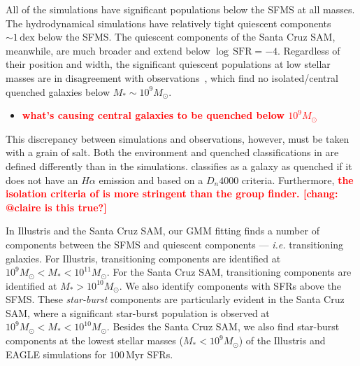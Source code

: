 \documentclass[preprint2,tighten]{aastex62}
\newcommand{\todo}[1]{{\bf \textcolor{red}{ #1}}}
\begin{document}
All of the simulations have significant populations below the SFMS at all 
masses. The hydrodynamical simulations have relatively tight quiescent components 
$\sim 1\,\mathrm{dex}$ below the SFMS. The quiescent components of the 
Santa Cruz SAM, meanwhile, are much broader and extend below 
$\log\,\mathrm{SFR} = -4$. Regardless of their position and width, the 
significant quiescent populations at low stellar masses are in disagreement
with observations~\citep{geha2012}, which find no isolated/central quenched 
galaxies below $M_* \sim 10^9 M_\odot$. 
\begin{itemize}
    \item \todo{what's causing central galaxies to be quenched below 
        $10^9M_\odot$}
\end{itemize}
This discrepancy between simulations and observations, however, must be 
taken with a grain of salt. Both the environment and quenched classifications 
in \cite{geha2012} are defined differently than in the simulations. 
\cite{geha2012} classifies as a galaxy as quenched if it
does not have an $H\alpha$ emission and based on a $D_n 4000$ criteria. 
Furthermore, \todo{the isolation criteria of \cite{geha2012} is more 
stringent than the group finder. [chang: @claire is this true?]} 

In Illustris and the Santa Cruz SAM, our GMM fitting
finds a number of components between the SFMS and quiescent components ---
\emph{i.e.} transitioning galaxies. For Illustris, transitioning components 
are identified at $10^9 M_\odot < M_* < 10^{11}M_\odot$. For the Santa Cruz SAM, 
transitioning components are identified at $M_* > 10^{10} M_\odot$. We also 
identify components with SFRs above the SFMS. These \emph{star-burst} 
components are particularly evident in the Santa Cruz SAM, where a significant
star-burst population is observed at $10^9 M_\odot < M_* < 10^{10} M_\odot$. 
Besides the Santa Cruz SAM, we also find star-burst components at the lowest
stellar masses ($M_* < 10^9 M_\odot$) of the Illustris and EAGLE simulations 
for $100\,\mathrm{Myr}$ SFRs. 
\end{document}
